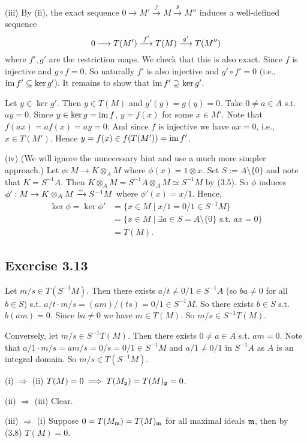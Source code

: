 \documentclass[../A&M.tex]{subfiles}
\begin{document}
(iii) By (ii), the exact sequence $0 \to M' \overset{f}{\to} M \overset{g}{\to} M''$ induces a well-defined sequence
$$
0 \longrightarrow T(M') \overset{f'}{\longrightarrow} T(M) \overset{g'}{\longrightarrow} T(M'')
$$
where $f',g'$ are the restriction maps. We check that this is also exact. Since $f$ is injective and $g\circ f = 0$. So naturally $f'$ is also injective and $g' \circ f' = 0$ (i.e., $\operatorname{im} f' \subseteq \ker g'$). It remains to show that $\operatorname{im} f' \supseteq \ker g'$.

Let $y\in \ker g'$. Then $y\in T(M)$ and $g'(y)=g(y)=0$. Take $0\neq a \in A$ s.t. $ay = 0$. Since $y \in \ker g = \operatorname{im} f$, $y = f(x)$ for some $x\in M'$. Note that $f(ax) = af(x) = ay = 0$. And since $f$ is injective we have $ax=0$, i.e., $x\in T(M')$. Hence $y = f(x) \in f(T(M')) = \operatorname{im} f'$.

(iv) (We will ignore the unnecessary hint and use a much more simpler approach.) Let $\phi: M \to K \otimes_A M$ where $\phi(x) = 1 \otimes x$. Set $S := A \setminus \{0\}$ and note that $K = S^{-1}A$. Then $K \otimes_A M = S^{-1}A \otimes_A M \simeq S^{-1}M$ by (3.5). So $\phi$ induces $\phi' : M \to K \otimes_A M \xrightarrow{\sim} S^{-1}M$ where $\phi'(x) = x/1$. Hence,
\begin{align*}
\ker \phi
= \ker \phi' 
&= \{ x \in M \mid x/1 = 0/1 \in S^{-1}M \}   \\
&= \{ x \in M \mid \exists a\in S = A \setminus \{0\} \text{ s.t. } ax = 0 \}   \\
&= T(M).
\end{align*}

\subsection*{Exercise 3.13}

Let $m/s \in T(S^{-1}M)$. Then there exists $a/t \neq 0/1 \in S^{-1}A$ (so $ba\neq 0$ for all $b\in S$) s.t. $a/t \cdot m/s = (am)/(ts) = 0/1 \in S^{-1}M$. So there exists $b \in S$ s.t. $b(am) = 0$. Since $ba \neq 0$ we have $m \in T(M)$. So $m/s \in S^{-1}T(M)$.

Conversely, let $m/s \in S^{-1}T(M)$. Then there exists $0 \neq a \in A$ s.t. $am=0$. Note that $a/1 \cdot m/s = am/s = 0/s = 0/1 \in S^{-1}M$ and $a/1 \neq 0/1$ in $S^{-1}A$ as $A$ is an integral domain. So $m/s \in T(S^{-1}M)$.

(i) $\Rightarrow$ (ii) $T(M)=0 \implies T(M_{\mathfrak{p}}) = T(M)_{\mathfrak{p}} = 0$.

(ii) $\Rightarrow$ (iii) Clear.

(iii) $\Rightarrow$ (i) Suppose $0 = T(M_{\mathfrak{m}}) = T(M)_{\mathfrak{m}}$ for all maximal ideals $\mathfrak{m}$, then by (3.8) $T(M)=0$.
\end{document}

